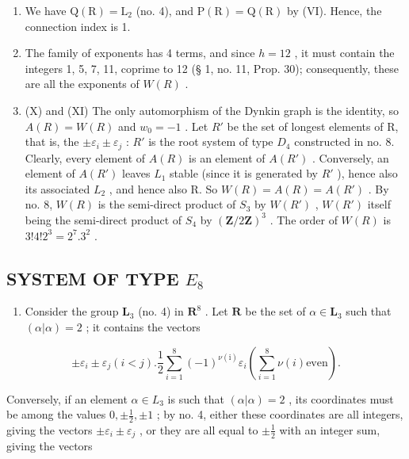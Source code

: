 \begin{enumerate}
\def\labelenumi{(\Roman{enumi})}
\setcounter{enumi}{7}
\item
  We have \(\mathrm{Q}(\mathrm{R}) = \mathrm{L}_2\) (no. 4), and \(\mathrm{P}(\mathrm{R}) = \mathrm{Q}(\mathrm{R})\) by (VI). Hence, the connection index is 1.
\item
  The family of exponents has 4 terms, and since \(h = 12\) , it must contain the integers 1, 5, 7, 11, coprime to 12 (§ 1, no. 11, Prop. 30); consequently, these are all the exponents of \(W(R)\) .
\item
  (X) and (XI) The only automorphism of the Dynkin graph is the identity, so \(A(R) = W(R)\) and \(w_{0} = -1\) . Let \(R'\) be the set of longest elements of R, that is, the \(\pm\varepsilon_{i} \pm \varepsilon_{j}\) : \(R'\) is the root system of type \(D_{4}\) constructed in no. 8. Clearly, every element of \(A(R)\) is an element of \(A(R')\) . Conversely, an element of \(A(R')\) leaves \(L_{1}\) stable (since it is generated by \(R'\) ), hence also its associated \(L_{2}\) , and hence also R. So \(W(R) = A(R) = A(R')\) . By no. 8, \(W(R)\) is the semi-direct product of \(S_{3}\) by \(W(R')\) , \(W(R')\) itself being the semi-direct product of \(S_{4}\) by \((\mathbf{Z}/2\mathbf{Z})^{3}\) . The order of \(W(R)\) is \(3!4!2^{3} = 2^{7}.3^{2}\) .
\end{enumerate}

\subsection{\texorpdfstring{SYSTEM OF TYPE \(E_{8}\)}{SYSTEM OF TYPE E\_8}}

\begin{enumerate}
\def\labelenumi{(\Roman{enumi})}
\tightlist
\item
  Consider the group \(\mathbf{L}_3\) (no. 4) in \(\mathbf{R}^8\) . Let \(\mathbf{R}\) be the set of \(\alpha \in \mathbf{L}_3\) such that \((\alpha |\alpha) = 2\) ; it contains the vectors
\end{enumerate}

\[
\pm \varepsilon_ {i} \pm \varepsilon_ {j} (i <   j). \frac {1}{2} \sum_ {i = 1} ^ {8} (- 1) ^ {\nu (\mathrm{i})} \varepsilon_ {i} \left(\sum_ {i = 1} ^ {8} \nu (i) \text {even}\right).
\]

Conversely, if an element \(\alpha \in L_3\) is such that \((\alpha |\alpha) = 2\) , its coordinates must be among the values \(0, \pm \frac{1}{2}, \pm 1\) ; by no. 4, either these coordinates are all integers, giving the vectors \(\pm \varepsilon_i \pm \varepsilon_j\) , or they are all equal to \(\pm \frac{1}{2}\) with an integer sum, giving the vectors


